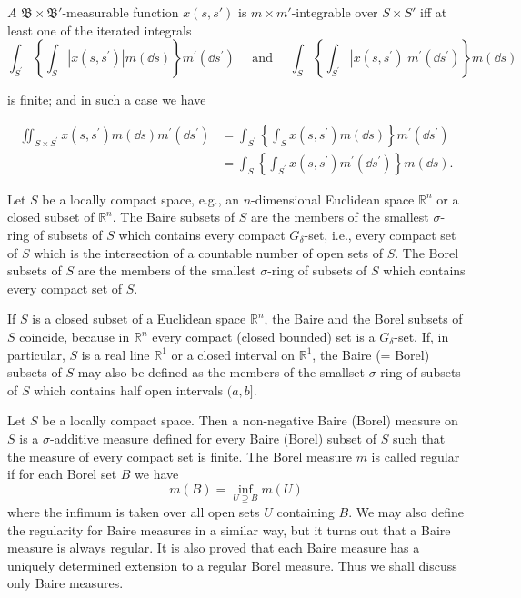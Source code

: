 \begin{theoremn} $A$ $\mathfrak{B} \times \mathfrak{B}'$-measurable function $x(s, s')$ is $m \times m'$-integrable over $S \times S'$ iff at least one of the iterated integrals 
\[
\int_ {S ^{\prime}} \left\{\int_{S} | x (s, s ^{\prime}) | m(\dd s) \right\} m ^{\prime} (\dd s ^{\prime}) \quad \text{ and } \quad \int_{S} \left\{\int_ {S ^{\prime}} | x (s, s ^{\prime}) | m ^{\prime} (\dd s ^{\prime}) \right\} m(\dd s)
\]

is finite; and in such a case we have 
\end{theoremn}
\[
\begin{aligned} \iint_ {S \times S ^{\prime}} x (s, s ^{\prime}) m(\dd s) m ^{\prime} (\dd s ^{\prime}) & = \int_ {S ^{\prime}} \left\{\int_{S} x (s, s ^{\prime}) m(\dd s) \right\} m ^{\prime} (\dd s ^{\prime}) \\ & = \int_{S} \left\{\int_ {S ^{\prime}} x (s, s ^{\prime}) m ^{\prime} (\dd s ^{\prime}) \right\} m(\dd s). \end{aligned}
\]


\begin{definitionu} Let $S$ be a locally compact space, e.g., an $n$-dimensional Euclidean space $\mathbb{R}^{n}$ or a closed subset of $\mathbb{R}^{n}$. The Baire subsets of $S$ are the members of the smallest $\sigma$-ring of subsets of $S$ which contains every compact $G_{\delta}$-set, i.e., every compact set of $S$ which is the intersection of a countable number of open sets of $S$. The Borel subsets of $S$ are the members of the smallest $\sigma$-ring of subsets of $S$ which contains every compact set of $S$. 
\end{definitionu}

If $S$ is a closed subset of a Euclidean space $\mathbb{R}^{n}$, the Baire and the Borel subsets of $S$ coincide, because in $\mathbb{R}^{n}$ every compact (closed bounded) set is a $G_\delta$-set. If, in particular, $S$ is a real line $\mathbb{R}^{1}$ or a closed interval on $\mathbb{R}^{1}$, the Baire (= Borel) subsets of $S$ may also be defined as the members of the smallset $\sigma$-ring of subsets of $S$ which contains half open intervals $(a, b]$. 

\begin{definitionu} Let $S$ be a locally compact space. Then a non-negative Baire (Borel) measure on $S$ is a $\sigma$-additive measure defined for every Baire (Borel) subset of $S$ such that the measure of every compact set is finite. The Borel measure $m$ is called regular if for each Borel set $B$ we have 
\[
m(B) = \inf\limits _{U \supseteq B} m(U)
\]
where the infimum is taken over all open sets $U$ containing $B$. We may also define the regularity for Baire measures in a similar way, but it turns out that a Baire measure is always regular. It is also proved that each Baire measure has a uniquely determined extension to a regular Borel measure. Thus we shall discuss only Baire measures. 
\end{definitionu}

